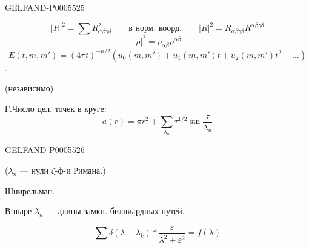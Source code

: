 \begin{GelfandAdjacentEvidence}{GELFAND-P000552}{5}

\[
|R|^2=\sum R_{\alpha\beta\gamma\delta}^2
\qquad\text{в норм. коорд.}\qquad
|R|^2=R_{\alpha\beta\gamma\delta}R^{\alpha\beta\gamma\delta}
\]
\[
|\rho|^2=\rho_{\alpha\beta}\rho^{\alpha\beta}
\]
\[
E(t,m,m')=(4\pi t)^{-n/2}
\left(u_0(m,m')+u_1(m,m')t+u_2(m,m')t^2+\ldots\right)
\]
.

 (независимо).

\uline{Г.}\quad\uline{Число цел. точек в круге}:
\[
a(r)=\pi r^2+\sum_{\lambda_n}\tau^{1/2}\sin\frac{\tau}{\lambda_n}
\]
\end{GelfandAdjacentEvidence}
\begin{GelfandAdjacentEvidence}{GELFAND-P000552}{6}

(\(\lambda_n\) — нули \(\zeta\)-ф-и Римана.) \quad{}

\uline{Шнирельман.}\par
В шаре \(\lambda_n\) — длины замкн. биллиардных путей.
\end{GelfandAdjacentEvidence}

\[
\sum\delta(\lambda-\lambda_k)*\frac{\varepsilon}{\lambda^2+\varepsilon^2}=f(\lambda)
\]


